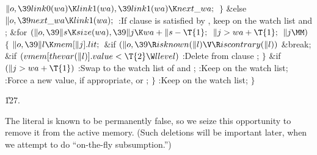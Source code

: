 ${}\|o,\39\\{link0}(\\{wa})\K\\{link1}(\\{wa}),\39\\{link1}(\\{wa})\K\\{next%
\_wa};{}$\6
\4${}\}{}$\5
\2\&{else}\1\5
${}\|o,\39\\{next\_wa}\K\\{link1}(\\{wa});{}$\2\6
:If clause  is satisfied by , keep  on the
watch list and \X;\6
\&{for} ${}(\|o,\39\|s\K\\{size}(\\{wa}),\39\|j\K\\{wa}+\|s-\T{1};{}$ ${}\|j>%
\\{wa}+\T{1};{}$ ${}\|j\MM){}$\5
${}\{{}$\1\6
${}\|o,\39\|l\K\\{mem}[\|j].\\{lit};{}$\6
\&{if} ${}(\|o,\39\R\\{isknown}(\|l)\V\R\\{iscontrary}(\|l)){}$\1\5
\&{break};\2\6
\&{if} ${}(\\{vmem}[\\{thevar}(\|l)].\\{value}<\T{2}\W\\{llevel}){}$\1\5
:Delete  from clause \X;\2\6
\4${}\}{}$\2\6
\&{if} ${}(\|j>\\{wa}+\T{1}){}$\1\5
:Swap  to the watch list of  and \X;\2\6
:Keep  on the watch list\X;\6
:Force a new value, if appropriate, or \X;\6
\4${}\}{}$\2\6
:Keep  on the watch list\X;\6
\4${}\}{}$\2\par
\U127.\fi

The literal  is known to be permanently false, so we seize this
opportunity to remove it from the active memory. (Such deletions will
be important later, when we attempt to do ``on-the-fly subsumption.'')

